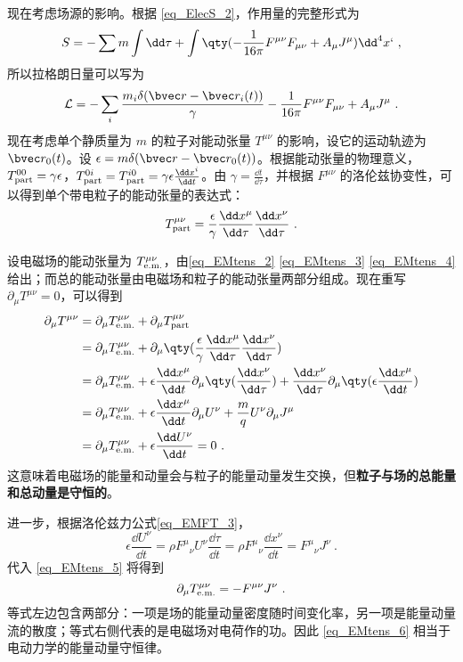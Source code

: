 现在考虑场源的影响。根据 \autoref{eq_ElecS_2}，作用量的完整形式为
\begin{equation}
S=-\sum{m\int \dd \tau}+\int \qty(-\frac{1}{16\pi}F^{\mu\nu}F_{\mu\nu}+A_\mu J^\mu ){\dd}^4 x`~,
\end{equation}
所以拉格朗日量可以写为
\begin{equation}
\mathcal{L}=-\sum_i \frac{m_i\delta(\bvec r-\bvec r_i(t))}{\gamma}-\frac{1}{16\pi}F^{\mu\nu}F_{\mu\nu}+A_\mu J^\mu~.
\end{equation}
现在考虑单个静质量为 $m$ 的粒子对能动张量 $T^{\mu\nu}$ 的影响，设它的运动轨迹为 $\bvec r_0(t)$。设 $\epsilon=m\delta(\bvec r-\bvec r_0(t))$。根据能动张量的物理意义，$T_{\rm{part}}^{00}=\gamma \epsilon$，$T_{\rm{part}}^{0i}=T_{\rm{part}}^{i0}=\gamma \epsilon \frac{\dd x^i}{\dd t}$。由 $\gamma=\frac{\dd t}{\dd \tau}$，并根据 $F^{\mu\nu}$ 的洛伦兹协变性，可以得到单个带电粒子的能动张量的表达式：
\begin{equation}
T_{\rm{part}}^{\mu\nu}=\frac{\epsilon}{\gamma}\frac{\dd x^\mu}{\dd \tau}\frac{\dd x^\nu}{\dd \tau}~.
\end{equation}

设电磁场的能动张量为 $T_{\rm{e.m.}}^{\mu\nu}$，由\autoref{eq_EMtens_2} \autoref{eq_EMtens_3} \autoref{eq_EMtens_4} 给出；而总的能动张量由电磁场和粒子的能动张量两部分组成。现在重写 $\partial_\mu T^{\mu\nu}=0$，可以得到
\begin{equation}\label{eq_EMtens_5}
\begin{aligned}
\partial_{\mu}T^{\mu\nu}&=\partial_\mu T_{\rm{e.m.}}^{\mu\nu}+\partial_\mu T_{\rm{part}}^{\mu\nu}\\
&=\partial_\mu T_{\rm{e.m.}}^{\mu\nu}+\partial_\mu\qty(\frac{\epsilon}{\gamma}\frac{\dd x^\mu}{\dd \tau}\frac{\dd x^\nu}{\dd \tau})\\
&=\partial_\mu T_{\rm{e.m.}}^{\mu\nu}+\epsilon \frac{\dd x^\mu}{\dd t}\partial_\mu\qty(\frac{\dd x^\nu}{\dd \tau})+\frac{\dd x^\nu}{\dd \tau}\partial_\mu\qty(\epsilon \frac{\dd x^\mu}{\dd t})\\
&=\partial_\mu T_{\rm{e.m.}}^{\mu\nu}+\epsilon \frac{\dd x^\mu}{\dd t}\partial_\mu U^\nu+\frac{m}{q}U^\nu\partial_\mu J^\mu \\
&=\partial_\mu T_{\rm{e.m.}}^{\mu\nu}+\epsilon \frac{\dd U^\nu}{\dd t}=0~.
\end{aligned}
\end{equation}
这意味着电磁场的能量和动量会与粒子的能量动量发生交换，但\textbf{粒子与场的总能量和总动量是守恒的}。

进一步，根据洛伦兹力公式\autoref{eq_EMFT_3}，
\begin{equation}
\epsilon \frac{\dd U^\nu}{\dd t}=\rho F^\mu{}_\nu U^\nu \frac{\dd \tau}{\dd t}=\rho F^\mu{}_\nu\frac{\dd x^\nu}{\dd t}=F^\mu{}_\nu J^\nu ~.
\end{equation}
代入 \autoref{eq_EMtens_5} 将得到
\begin{equation}\label{eq_EMtens_6}
\partial_\mu T_{\rm{e.m.}}^{\mu\nu}=-F^{\mu\nu}J^\nu~.
\end{equation}
等式左边包含两部分：一项是场的能量动量密度随时间变化率，另一项是能量动量流的散度；等式右侧代表的是电磁场对电荷作的功。因此 \autoref{eq_EMtens_6} 相当于电动力学的能量动量守恒律。
